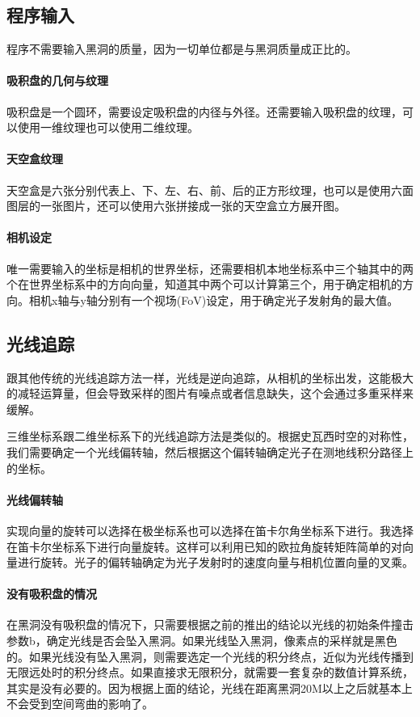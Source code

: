 \subsection{程序输入}
程序不需要输入黑洞的质量，因为一切单位都是与黑洞质量成正比的。
\paragraph{吸积盘的几何与纹理}
吸积盘是一个圆环，需要设定吸积盘的内径与外径。还需要输入吸积盘的纹理，可以使用一维纹理也可以使用二维纹理。

\paragraph{天空盒纹理}
天空盒是六张分别代表上、下、左、右、前、后的正方形纹理，也可以是使用六面图层的一张图片，还可以使用六张拼接成一张的天空盒立方展开图。

\paragraph{相机设定}
唯一需要输入的坐标是相机的世界坐标，还需要相机本地坐标系中三个轴其中的两个在世界坐标系中的方向向量，知道其中两个可以计算第三个，用于确定相机的方向。相机x轴与y轴分别有一个视场(FoV)设定，用于确定光子发射角的最大值。

\subsection{光线追踪}
跟其他传统的光线追踪方法一样，光线是逆向追踪，从相机的坐标出发，这能极大的减轻运算量，但会导致采样的图片有噪点或者信息缺失，这个会通过多重采样来缓解。

三维坐标系跟二维坐标系下的光线追踪方法是类似的。根据史瓦西时空的对称性，我们需要确定一个光线偏转轴，然后根据这个偏转轴确定光子在测地线积分路径上的坐标。

\paragraph{光线偏转轴}
实现向量的旋转可以选择在极坐标系也可以选择在笛卡尔角坐标系下进行。我选择在笛卡尔坐标系下进行向量旋转。这样可以利用已知的欧拉角旋转矩阵简单的对向量进行旋转。光子的偏转轴确定为光子发射时的速度向量与相机位置向量的叉乘。

\paragraph{没有吸积盘的情况}
在黑洞没有吸积盘的情况下，只需要根据之前的推出的结论以光线的初始条件撞击参数b，确定光线是否会坠入黑洞。如果光线坠入黑洞，像素点的采样就是黑色的。如果光线没有坠入黑洞，则需要选定一个光线的积分终点，近似为光线传播到无限远处时的积分终点。如果直接求无限积分，就需要一套复杂的数值计算系统，其实是没有必要的。因为根据上面的结论，光线在距离黑洞20M以上之后就基本上不会受到空间弯曲的影响了。

